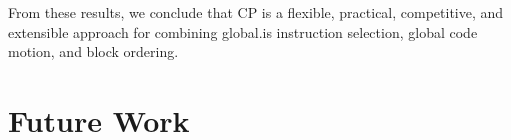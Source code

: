 From these results, we conclude that \glsdesc{CP} is a flexible, practical,
competitive, and extensible approach for combining \gls{global.is}
\gls{instruction selection}, \gls{global code motion}, and \gls{block ordering}.


\section{Future Work}

